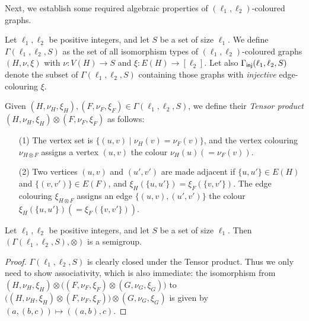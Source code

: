 \documentclass[authorcolumns,numberwithinsect]{no-lipics-v2022}
\begin{document}
Next, we establish some required algebraic properties of $(\ell_1,\ell_2)$-coloured graphs.
\begin{definition}
    Let $\ell_1,\ell_2$ be positive integers, and let $S$ be a set of size $\ell_1$. We define $\Gamma(\ell_1,\ell_2,S)$ as the set of all isomorphism types of $(\ell_1,\ell_2)$-coloured graphs $(H,\nu,\xi)$ with $\nu: V(H)\to S$ and $\xi: E(H) \to [\ell_2]$. Let also $\Gamma_{\text{\sf{inj}}}(\ell_1, \ell_2, S)$ denote the subset of $\Gamma(\ell_1,\ell_2,S)$ containing those graphs with \emph{injective} edge-colouring $\xi$. 
\end{definition}


\noindent Given $(H,\nu_H,\xi_H),(F,\nu_F,\xi_F) \in \Gamma(\ell_1,\ell_2,S)$, we define their \emph{Tensor product} $(H,\nu_H,\xi_H)\otimes(F,\nu_F,\xi_F)$ as follows:
\begin{itemize}
    \item[(1)] The vertex set is $\{ (u,v) \mid \nu_H(v)=\nu_F(v) \}$,
    and the vertex colouring $\nu_{H\otimes F}$ assigns a vertex $(u,v)$ the colour $\nu_H(u)(=\nu_F(v))$.
    \item[(2)] Two vertices $(u,v)$ and $(u',v')$ are made adjacent if $\{u,u'\}\in E(H)$ and $\{(v,v')\}\in E(F)$, and $\xi_H(\{u,u'\})=\xi_F(\{v,v'\})$. The edge colouring $\xi_{H\otimes F}$ assigns an edge $\{(u,v),(u',v')\}$ the colour $\xi_H(\{u,u'\})(=\xi_F(\{v,v'\}))$.
\end{itemize}

\begin{proposition}\label{prop:semigroup}
     Let $\ell_1,\ell_2$ be positive integers, and let $S$ be a set of size $\ell_1$. Then $(\Gamma(\ell_1,\ell_2,S),\otimes)$ is a semigroup.
\end{proposition}
\begin{proof}
    $\Gamma(\ell_1,\ell_2,S)$ is clearly closed under the Tensor product.
    Thus we only need to show associativity, which is also immediate: the isomorphism from $(H,\nu_H,\xi_H)\otimes\big((F,\nu_F,\xi_F) \otimes (G,\nu_G,\xi_G)\big)$ to $\big((H,\nu_H,\xi_H)\otimes(F,\nu_F,\xi_F)\big) \otimes (G,\nu_G,\xi_G)$ is given by $(a,(b,c))\mapsto ((a,b),c)$.
\end{proof}
\end{document}
